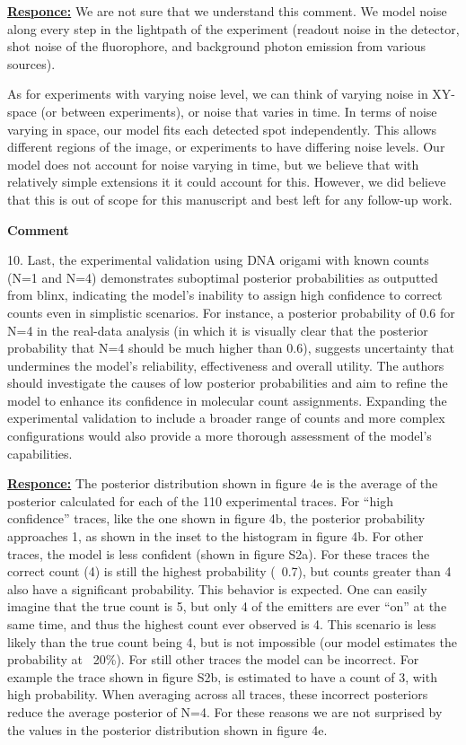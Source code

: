 \documentclass{article}
\begin{document}
\underline{\textbf{Responce:}}
We are not sure that we understand this comment. We model noise along every step in the 
lightpath of the experiment (readout noise in the detector, shot noise of the fluorophore, and
background photon emission from various sources). 

As for experiments with varying noise level, we can think of varying noise in XY-space (or between experiments), 
or noise that varies in time. In terms of noise varying in space, our model fits each detected spot 
independently. This allows different regions of the image, or experiments to have differing noise levels.
%
Our model does not account for noise varying in time, but we believe that with relatively simple extensions it 
it could account for this. However, we did believe that this is out of scope for this manuscript and best left 
for any follow-up work. 

\textbf{Comment}

10. Last, the experimental validation using DNA origami with known counts (N=1 and N=4) 
demonstrates suboptimal posterior probabilities as outputted from blinx, 
indicating the model's inability to assign high confidence to correct counts 
even in simplistic scenarios. For instance, a posterior probability of 0.6 for N=4 
in the real-data analysis (in which it is visually clear that the posterior probability 
that N=4 should be much higher than 0.6), suggests uncertainty that undermines the model's 
reliability, effectiveness and overall utility. The authors should investigate the causes 
of low posterior probabilities and aim to refine the model to enhance its confidence in 
molecular count assignments. Expanding the experimental validation to include a broader 
range of counts and more complex configurations would also provide a more thorough assessment 
of the model's capabilities.

\underline{\textbf{Responce:}}
The posterior distribution shown in figure 4e is the average of the posterior 
calculated for each of the 110 experimental traces. 
For “high confidence” traces, like the one shown in figure 4b, 
the posterior probability approaches 1, as shown in the inset to the histogram in figure 4b. 
For other traces, the model is less confident (shown in figure S2a). 
For these traces the correct count (4) is still the highest probability (~0.7), 
but counts greater than 4 also have a significant probability. 
This behavior is expected. 
One can easily imagine that the true count is 5, but only 4 of the emitters are 
ever “on” at the same time, and thus the highest count ever observed is 4. 
This scenario is less likely than the true count being 4, but is not impossible 
(our model estimates the probability at ~20\%). 
For still other traces the model can be incorrect. 
For example the trace shown in figure S2b, is estimated to have a count of 3, with high probability. 
When averaging across all traces, these incorrect posteriors reduce the average posterior of N=4. 
For these reasons we are not surprised by the values in the posterior distribution shown in figure 4e.
\end{document}
